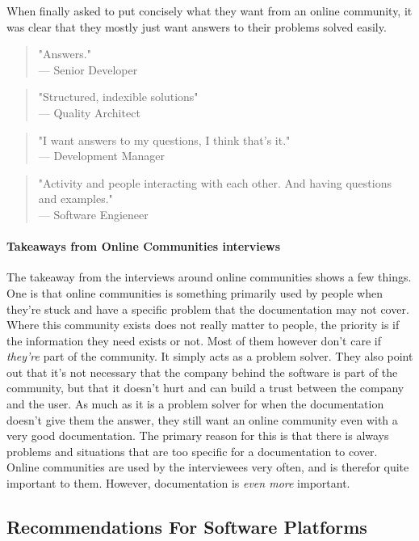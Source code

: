 \documentclass{article}
\begin{document}
When finally asked to put concisely what they want from an online community, it was clear that they mostly just want answers to their problems solved easily.
\begin{quote}
"Answers."\\
--- Senior Developer
\end{quote}
\begin{quote}
"Structured, indexible solutions"\\ --- Quality Architect
\end{quote}
\begin{quote}
"I want answers to my questions, I think that's it." \\ --- Development Manager
\end{quote}
\begin{quote}
"Activity and people interacting with each other. And having questions and examples."\\--- Software Engieneer
\end{quote}
\paragraph{Takeaways from Online Communities interviews}
The takeaway from the interviews around online communities shows a few things. One is that online communities is something primarily used by people when they're stuck and have a specific problem that the documentation may not cover. Where this community exists does not really matter to people, the priority is if the information they need exists or not. Most of them however don't care if \textit{they're} part of the community. It simply acts as a problem solver. They also point out that it's not necessary that the company behind the software is part of the community, but that it doesn't hurt and can build a trust between the company and the user. As much as it is a problem solver for when the documentation doesn't give them the answer, they still want an online community even with a very good documentation. The primary reason for this is that there is always problems and situations that are too specific for a documentation to cover. Online communities are used by the interviewees very often, and is therefor quite important to them. However, documentation is \textit{even more} important.
\subsection{Recommendations For Software Platforms}
\end{document}

